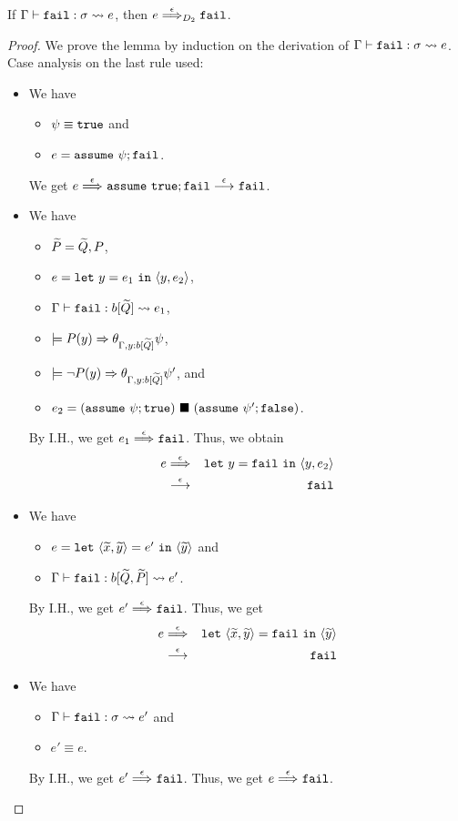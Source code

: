 \begin{lemma}
\label{lem:fail} If \(\Gamma \vdash \mathtt{fail} : \sigma \leadsto e\), then \(e
\stackrel{\epsilon}{\Longrightarrow}_{D_2} \mathtt{fail}\).
\end{lemma}
\begin{proof}
We prove the lemma by induction on the derivation of \(\Gamma \vdash \mathtt{fail} : \sigma \leadsto e\).
Case analysis on the last rule used:
\begin{itemize}
\item[] 
We have
\begin{itemize}
\item \(\psi \equiv \mathtt{true}\) and
\item \(e=\mathtt{assume~}\psi; \mathtt{fail}\).
\end{itemize}
We get \(e \stackrel{\epsilon}{\Longrightarrow}_{} \mathtt{assume~}\mathtt{true}; \mathtt{fail} \stackrel{\epsilon}{\longrightarrow}_{} \mathtt{fail}\).

\item[] 
We have
\begin{itemize}
\item \(\widetilde{P}=\widetilde{Q},P\),
\item \(e=\mathtt{let~}y=e_1\mathtt{~in~}{\langle{y,e_2}\rangle}\),
\item \(\Gamma \vdash \mathtt{fail} : b[\widetilde{Q}] \leadsto e_1\),
\item \(\models P(y) \Rightarrow \theta_{\Gamma,y:b[\widetilde{Q}]}\psi\),
\item \(\models \neg P(y) \Rightarrow \theta_{\Gamma,y:b[\widetilde{Q}]}\psi'\), and
\item \(e_2=(\mathtt{assume~}\psi; \mathtt{true})\ \blacksquare\ (\mathtt{assume~}\psi'; \mathtt{false})\).
\end{itemize}
By I.H., we get \(e_1 \stackrel{\epsilon}{\Longrightarrow}_{} \mathtt{fail}\).
Thus, we obtain
\begin{eqnarray*}
e &\stackrel{\epsilon}{\Longrightarrow}_{}& \mathtt{let~}y=\mathtt{fail}\mathtt{~in~}{\langle{y,e_2}\rangle} \\
&\stackrel{\epsilon}{\longrightarrow}_{}& \mathtt{fail}
\end{eqnarray*}

\item[] 
We have
\begin{itemize}
\item \(e=\mathtt{let~}\langle{\widetilde{x},\widetilde{y}}\rangle=e'\mathtt{~in~}{\langle{\widetilde{y}}\rangle}\) and
\item \(\Gamma \vdash \mathtt{fail} : b[\widetilde{Q},\widetilde{P}] \leadsto e'\).
\end{itemize}
By I.H., we get \(e' \stackrel{\epsilon}{\Longrightarrow}_{} \mathtt{fail}\).
Thus, we get
\begin{eqnarray*}
e &\stackrel{\epsilon}{\Longrightarrow}_{}& \mathtt{let~}\langle{\widetilde{x},\widetilde{y}}\rangle=\mathtt{fail}\mathtt{~in~}{\langle{\widetilde{y}}\rangle} \\
&\stackrel{\epsilon}{\longrightarrow}_{}& \mathtt{fail}
\end{eqnarray*}

\item[] 
We have
\begin{itemize}
\item \(\Gamma \vdash \mathtt{fail} : \sigma \leadsto e'\) and
\item \(e' \equiv e\).
\end{itemize}
By I.H., we get \(e' \stackrel{\epsilon}{\Longrightarrow}_{} \mathtt{fail}\).
Thus, we get \(e \stackrel{\epsilon}{\Longrightarrow}_{} \mathtt{fail}\).

\end{itemize}
\end{proof}

